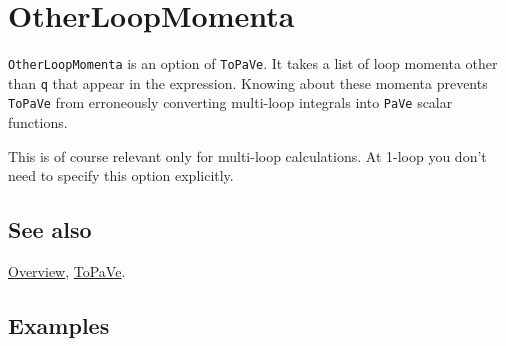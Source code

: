 \documentclass[../FeynCalcManual.tex]{subfiles}
\begin{document}
\hypertarget{otherloopmomenta}{
\section{OtherLoopMomenta}\label{otherloopmomenta}}

\texttt{OtherLoopMomenta} is an option of \texttt{ToPaVe}. It takes a
list of loop momenta other than \texttt{q} that appear in the
expression. Knowing about these momenta prevents \texttt{ToPaVe} from
erroneously converting multi-loop integrals into \texttt{PaVe} scalar
functions.

This is of course relevant only for multi-loop calculations. At 1-loop
you don't need to specify this option explicitly.

\subsection{See also}

\hyperlink{toc}{Overview}, \hyperlink{topave}{ToPaVe}.

\subsection{Examples}
\end{document}
